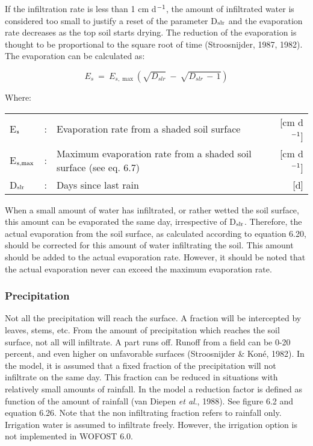 If the infiltration rate is less than 1 cm d$^{{\rm -1}}$, the amount of infiltrated water is considered
too small to justify a reset of the parameter D$_{{\rm slr}}$ and the evaporation rate decreases as the
top soil starts drying. The reduction of the evaporation is thought to be proportional to the
square root of time (Stroosnijder, 1987, 1982). The evaporation can be calculated as:

\begin{equation}
E _{s} ~=~ E _{s,\max } ( \sqrt{D _{slr} } ~-~ \sqrt{D _{slr} \, -\, 1} )
\end{equation}

Where:\\[5pt]
\begin{tabularx}{\textwidth}{llXr}
E$_{{\rm s}}$ &:& Evaporation rate from a shaded soil surface  & [cm d$^{{\rm -1}}$]\\
E$_{{\rm s,max}}$ &:& Maximum evaporation rate from a shaded soil
   surface (see eq. 6.7)  & [cm d$^{{\rm -1}}$]\\
D$_{{\rm slr}}$ &:& Days since last rain  & [d]\\
\end{tabularx}

When a small amount of water has infiltrated, or rather wetted the soil surface, this
amount can be evaporated the same day, irrespective of D$_{{\rm slr}}$. Therefore, the actual
evaporation from the soil surface, as calculated according to equation 6.20, should be
corrected for this amount of water infiltrating the soil. This amount should be added to
the actual evaporation rate. However, it should be noted that the actual evaporation never
can exceed the maximum evaporation rate.

\subsubsection{Precipitation}
Not all the precipitation will reach the surface. A fraction will be intercepted by leaves,
stems, etc. From the amount of precipitation which reaches the soil surface, not all will
infiltrate. A part runs off. Runoff from a field can be 0-20 percent, and even higher on
unfavorable surfaces (Stroosnijder \& Kon\'{e}, 1982). In the model, it is assumed that a
fixed fraction of the precipitation will not infiltrate on the same day. This fraction can be
reduced in situations with relatively small amounts of rainfall. In the model a reduction
factor is defined as function of the amount of rainfall (van Diepen {\it et al}., 1988). See 
figure 6.2 and equation 6.26. Note that the non infiltrating fraction refers to rainfall only.
Irrigation water is assumed to infiltrate freely. However, the irrigation option is not
implemented in WOFOST 6.0.

